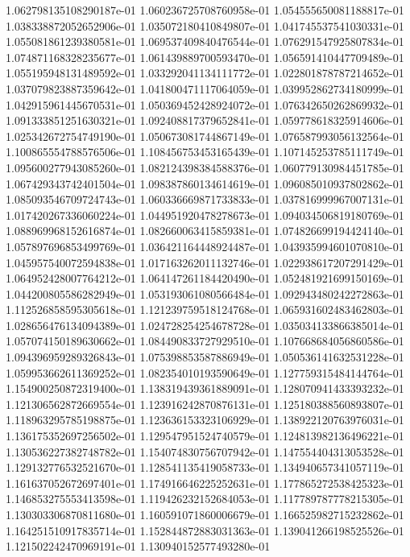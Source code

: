 1.062798135108290187e-01
1.060236725708760958e-01
1.054555650081188817e-01
1.038338872052652906e-01
1.035072180410849807e-01
1.041745537541030331e-01
1.055081861239380581e-01
1.069537409840476544e-01
1.076291547925807834e-01
1.074871168328235677e-01
1.061439889700593470e-01
1.056591410447709489e-01
1.055195948131489592e-01
1.033292041134111772e-01
1.022801878787214652e-01
1.037079823887359642e-01
1.041800471117064059e-01
1.039952862734180999e-01
1.042915961445670531e-01
1.050369452428924072e-01
1.076342650262869932e-01
1.091333851251630321e-01
1.092408817379652841e-01
1.059778618325914606e-01
1.025342672754749190e-01
1.050673081744867149e-01
1.076587993056132564e-01
1.100865554788576506e-01
1.108456753453165439e-01
1.107145253785111749e-01
1.095600277943085260e-01
1.082124398384588376e-01
1.060779130984451785e-01
1.067429343742401504e-01
1.098387860134614619e-01
1.096085010937802862e-01
1.085093546709724743e-01
1.060336669871733833e-01
1.037816999967007131e-01
1.017420267336060224e-01
1.044951920478278673e-01
1.094034506819180769e-01
1.088969968152616874e-01
1.082660063415859381e-01
1.074826699194424140e-01
1.057897696853499769e-01
1.036421164448924487e-01
1.043935994601070810e-01
1.045957540072594838e-01
1.017163262011132746e-01
1.022938617207291429e-01
1.064952428007764212e-01
1.064147261184420490e-01
1.052481921699150169e-01
1.044200805586282949e-01
1.053193061080566484e-01
1.092943480242272863e-01
1.112526858595305618e-01
1.121239759518124768e-01
1.065931602483462803e-01
1.028656476134094389e-01
1.024728254254678728e-01
1.035034133866385014e-01
1.057074150189630662e-01
1.084490833727929510e-01
1.107668684056860586e-01
1.094396959289326843e-01
1.075398853587886949e-01
1.050536141632531228e-01
1.059953662611369252e-01
1.082354010193590649e-01
1.127759315484144764e-01
1.154900250872319400e-01
1.138319439361889091e-01
1.128070941433393232e-01
1.121306562872669554e-01
1.123916242870876131e-01
1.125180388560893807e-01
1.118963295785198875e-01
1.123636153323106929e-01
1.138922120763976031e-01
1.136175352697256502e-01
1.129547951524740579e-01
1.124813982136496221e-01
1.130536227382748782e-01
1.154074830756707942e-01
1.147554404313053528e-01
1.129132776532521670e-01
1.128541135419058733e-01
1.134940657341057119e-01
1.161637052672697401e-01
1.174916646225252631e-01
1.177865272538425323e-01
1.146853275553413598e-01
1.119426232152684053e-01
1.117789787778215305e-01
1.130303306870811680e-01
1.160591071860006679e-01
1.166525982715232862e-01
1.164251510917835714e-01
1.152844872883031363e-01
1.139041266198525526e-01
1.121502242470969191e-01
1.130940152577493280e-01
